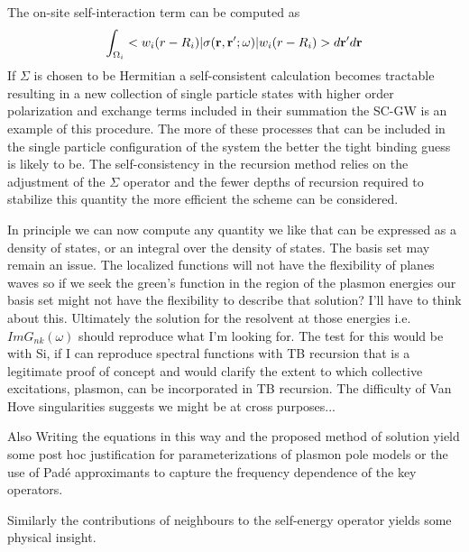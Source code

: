 \documentclass{article}
\def\r{{\bf r}}
\begin{document}
The on-site self-interaction term can be computed as
%
\begin{equation}
\int_{\Omega_{i}}<w_{i}(r-R_{i})|\sigma(\r,\r';\omega)|w_{i}(r-R_{i})>d\r'd\r
\end{equation}
%
If $\Sigma$ is chosen to be Hermitian a self-consistent calculation 
becomes tractable resulting in a new collection of single particle 
states with higher order polarization and exchange terms included 
in their summation the SC-GW is an example of this procedure. The more of
these processes that can be included in the single particle configuration of the
system the better the tight binding guess is likely to be. The self-consistency
in the recursion method relies on the adjustment of the $\Sigma$ operator and the
fewer depths of recursion required to stabilize this quantity the more efficient the
scheme can be considered.

In principle we can now compute any quantity we like that can be expressed
as a density of states, or an integral over the density of states.
The basis set may remain an issue. The localized functions will not have the 
flexibility of planes waves so if we seek the green's function in the 
region of the plasmon energies our basis set might not have the flexibility 
to describe that solution? I'll have to think about this. Ultimately the 
solution for the resolvent at those energies i.e. $ImG_{nk}(\omega)$ should 
reproduce what I'm looking for. The test for this would be with Si, if 
I can reproduce spectral functions with TB recursion that is a legitimate 
proof of concept and would clarify the extent to which collective excitations,
plasmon, can be incorporated in TB recursion. The difficulty of 
Van Hove singularities suggests we might be at cross purposes...

Also Writing the equations in this way and the proposed method of solution
yield some post hoc justification for parameterizations of plasmon
pole models or the use of Pad\'e approximants to capture the frequency dependence
of the key operators.

Similarly the contributions of neighbours to the self-energy 
operator yields some physical insight.
\end{document}
